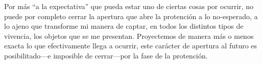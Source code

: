 Por más ``a la expectativa'' que pueda estar uno de ciertas cosas por
ocurrir, no puede por completo cerrar la apertura que abre la protención
a lo no-esperado, a lo ajeno que transforme mi manera de captar, en
todos los distintos tipos de vivencia, los objetos que se me presentan.
Proyectemos de manera más o menos exacta lo que efectivamente llega a
ocurrir, este carácter de apertura al futuro es posibilitado---e
imposible de cerrar---por la fase de la protención.
